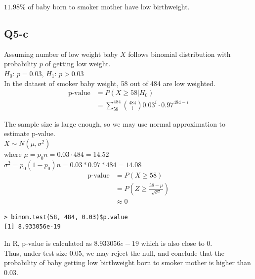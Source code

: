 \documentclass[11pt,letterpaper]{article}
\begin{document}
\noindent $11.98 \%$ of baby born to smoker mother have low birthweight. 

\subsection*{Q5-c}
\noindent Assuming number of low weight baby $X$ follows binomial distribution with probability $p$ of getting low weight. \\
\noindent $H_0$: $p = 0.03$, $H_1$: $p > 0.03$ \\
\noindent In the dataset of smoker baby weight, 58 out of 484 are low weighted.
\begin{align*}
\text{p-value} &= P(X \geq 58 | H_0) \\
&= \sum_{58}^{484} {484 \choose i}  0.03^{i} \cdot 0.97^{484-i}
\end{align*}

\noindent The sample size is large enough, so we may use normal approximation to estimate p-value. \\
\noindent $X \sim N(\mu, \sigma^2)$ \\
\noindent  where $\mu = p_0 n = 0.03 \cdot 484 = 14.52$ \\
$\sigma^2 = p_0(1-p_0)n = 0.03 * 0.97 * 484 = 14.08$  \\
\begin{align*}
\text{p-value} &= P(X \geq 58) \\
&= P(Z \geq \frac{58 - \mu }{\sqrt{\sigma^2}}) \\
&\approx 0
\end{align*}

\begin{verbatim}
> binom.test(58, 484, 0.03)$p.value
[1] 8.933056e-19
\end{verbatim}

\noindent In R, p-value is calculated as $8.933056e-19$ which is also close to 0.\\
\noindent Thus, under test size 0.05, we may reject the null, and conclude that the probability of baby getting low birthweight born to smoker mother is higher than 0.03.
\end{document}
